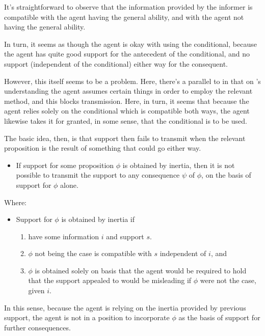 \documentclass[10pt]{article}
\begin{document}
\begin{note}
  It's straightforward to observe that the information provided by the informer is compatible with the agent having the general ability, and with the agent not having the general ability.

  In turn, it seems as though the agent is okay with using the conditional, because the agent has quite good support for the antecedent of the conditional, and no support (independent of the conditional) either way for the consequent.

  However, this itself seems to be a problem.
  Here, there's a parallel to \citeauthor{Wright:2016wl} in that on \citeauthor{Wright:2016wl}'s understanding the agent assumes certain things in order to employ the relevant method, and this blocks transmission.
  Here, in turn, it seems that because the agent relies solely on the conditional which is compatible both ways, the agent likewise takes it for granted, in some sense, that the conditional is to be used.

  The basic idea, then, is that support then fails to transmit when the relevant proposition is the result of something that could go either way.

  \begin{itemize}
  \item If support for some proposition \(\phi\) is obtained by inertia, then it is not possible to transmit the support to any consequence \(\psi\) of \(\phi\), on the basis of support for \(\phi\) alone.
  \end{itemize}
  Where:
  \begin{itemize}
  \item Support for \(\phi\) is obtained by inertia if
    \begin{enumerate}
    \item have some information \(i\) and support \(s\).
    \item \(\phi\) not being the case is compatible with \(s\) independent of \(i\), and
    \item \(\phi\) is obtained solely on basis that the agent would be required to hold that the support appealed to would be misleading if \(\phi\) were not the case, given \(i\).
    \end{enumerate}
  \end{itemize}
  In this sense, because the agent is relying on the inertia provided by previous support, the agent is not in a position to incorporate \(\phi\) as the basis of support for further consequences.


\end{note}
\end{document}
